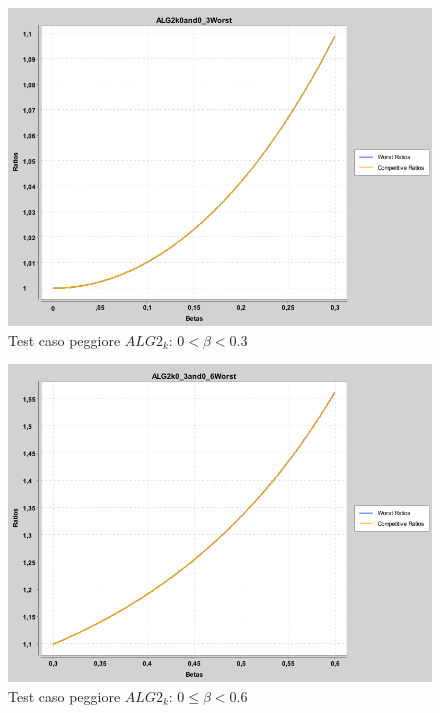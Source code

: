 \documentclass[twoside,openany,titlepage,fleqn,
	headinclude,12pt,a4paper,BCOR5mm,footinclude]{scrbook}
\begin{document}
\begin{figure}[H]
\caption{Test caso peggiore $ALG2_{k}$: $0 < \beta < 0.3$}
\centering
\includegraphics[scale=0.4]{worst/ALG2k0and0_3Worst.png}
\end{figure}
\begin{figure}[H]
\caption{Test caso peggiore $ALG2_{k}$: $0 \leq \beta < 0.6$}
\centering
\includegraphics[scale=0.4]{worst/ALG2k0_3and0_6Worst.png}
\end{figure}
\end{document}
